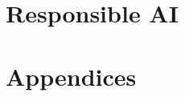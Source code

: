 \documentclass[11pt,twoside]{book}
\begin{document}
\part{Responsible AI}



\appendix
\part{Appendices}





\backmatter
\end{document}
